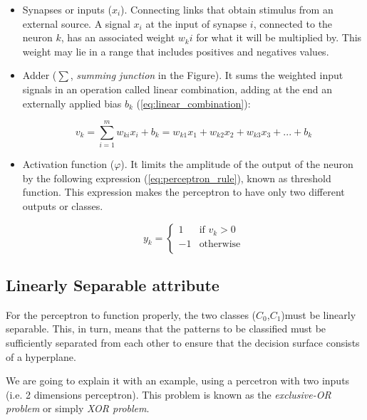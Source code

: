 \begin{itemize}
	\item Synapses or inputs ($x_i$). Connecting links that obtain stimulus from an external source. A signal $x_i$ at the input of synapse $i$, connected to the neuron $k$, has an associated weight $w_ki$ for what it will be multiplied by. This weight may lie in a range that includes positives and negatives values.

	\item Adder ($\sum$, \textit{summing junction} in the Figure). It sums the weighted input signals in an operation called linear combination, adding at the end an externally applied bias $b_k$ (\ref{eq:linear_combination}):

	\begin{equation}
	    \label{eq:linear_combination}
	        v_k=\sum_{i=1}^{m} w_{ki} x_i + b_k = w_{k1} x_1 + w_{k2} x_2 + w_{k3} x_3 + ... + b_k%
	\end{equation}

	\item Activation function ($\varphi$). It limits the amplitude of the output of the neuron by the following expression (\ref{eq:perceptron_rule}), known as threshold function. This expression makes the perceptron to have only two different outputs or classes. 

	\begin{equation}
	    \label{eq:perceptron_rule}
			y_k =
				\begin{cases}
			     	1 & \text{if } v_k > 0 \\
			        -1 & \text{otherwise} \\
				\end{cases}
		\end{equation}
	\end{itemize}

	\subsection{Linearly Separable attribute}
	For the perceptron to function properly, the two classes ($C_0$,$C_1$)must be linearly separable. This, in turn, means that the patterns to be classified must be sufficiently separated from each other to ensure that the decision surface consists of a hyperplane.

	We are going to explain it with an example, using a percetron with two inputs (i.e. 2 dimensions perceptron). This problem is known as the \textit{exclusive-OR problem} or simply \textit{XOR problem}.


